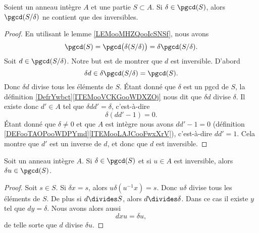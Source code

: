 \begin{lemma}		\label{LEMooZSUNooUmYmgt}
	Soient un anneau intègre \( A\) et une partie \( S\subset A\). Si \( \delta\in\pgcd(S)\), alors \( \pgcd(S/\delta)\) ne contient que des inversibles.
\end{lemma}

\begin{proof}
	En utilisant le lemme \ref{LEMooMHZQooIcSNSf}, nous avons
	\begin{equation}
		\pgcd(S)=\pgcd\big( \delta(S/\delta) \big)=\delta\pgcd(S/\delta).
	\end{equation}
	Soit \( d\in\pgcd(S/\delta)\). Notre but est de montrer que \( d\) est inversible. D'abord
	\begin{equation}
		\delta d\in \delta\pgcd(S/\delta)=\pgcd(S).
	\end{equation}
	Donc \( \delta d\) divise tous les éléments de \( S\). Étant donné que \( \delta\) est un pgcd de \( S\), la définition \ref{DefrYwbct}\ref{ITEMooVCKGooWDXZOj} nous dit que \( \delta d\) divise \( \delta\). Il existe donc \( d'\in A\) tel que \( \delta dd'=\delta\), c'est-à-dire
	\begin{equation}
		\delta(dd'-1)=0.
	\end{equation}
	Étant donné que \( \delta\neq 0\) et que \( A\) est intègre nous avons \( dd'-1=0\) (définition \ref{DEFooTAOPooWDPYmd}\ref{ITEMooLAJCooFwxXrV}), c'est-à-dire \( dd'=1\). Cela montre que \( d'\) est un inverse de \( d\), et donc que \( d\) est inversible.
\end{proof}

\begin{lemma}		\label{LEMooZKASooKstTuK}
	Soit un anneau intègre \( A\). Si \( \delta\in\pgcd(S)\) et si \( u\in A\) est inversible, alors \( \delta u\in\pgcd(S)\).
\end{lemma}

\begin{proof}
	Soit \( s\in S\). Si \( \delta x=s\), alors \( u\delta (u^{-1} x)=s\). Donc \( u\delta\) divise tous les éléments de \( S\). De plus si \( d\divides S\), alors \( d\divides \delta\). Dans ce cas il existe \( y\) tel que \( dy=\delta\). Nous avons alors aussi
	\begin{equation}
		dxu=\delta u,
	\end{equation}
	de telle sorte que \( d\) divise \( \delta u\).
\end{proof}


